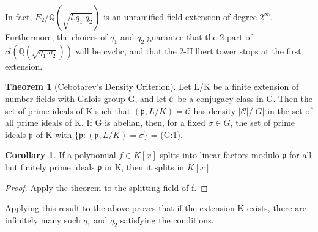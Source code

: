 \documentclass[12pt]{extarticle}
\newcommand{\<}{\langle}
\renewcommand{\>}{\rangle}
\theoremstyle{definition}
\newtheorem{theorem}{Theorem}
\newtheorem{corollary}{Corollary}
\begin{document}
\begin{center}
\end{center}
In fact, $E_2/\mathbb{Q}(\sqrt{l.q_1.q_2})$ is an unramified field extension of degree $2^{\infty}$. Furthermore, the choices of $q_1$ and $q_2$ guarantee that the 2-part of $cl(\mathbb{Q}(\sqrt{q_1.q_2}))$ will be cyclic, and that the 2-Hilbert tower stops at the first extension. 
\begin{theorem}[Cebotarev's Density Criterion]
Let L/K be a finite extension of
number fields with Galois group G, and let $\mathcal{C}$ be a conjugacy class in G. Then the set of
prime ideals of K such that $(\mathfrak{p},L/K)=\mathcal{C}$ has density $|\mathcal{C}|/|G|$ in the set of all prime
ideals of K. If G is abelian, then, for a fixed $\sigma\in G$, the set of prime ideals $\mathfrak{p}$ of K with $\{\mathfrak{p}:(\mathfrak{p},L/K)=\sigma\}$  = (G:1).
\end{theorem}
\begin{corollary}
 If a polynomial $f \in K[x]$ splits into linear factors modulo $\mathfrak{p}$ for all but finitely prime ideals $\mathfrak{p}$ in K, then it splits in $K[x]$.
\end{corollary}
\begin{proof}
Apply the theorem to the splitting field of f.
\end{proof}
Applying this result to the above proves that if the extension K exists, there are infinitely many such $q_1$ and $q_2$ satisfying the conditions.
\end{document}
